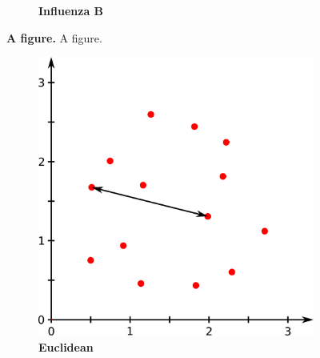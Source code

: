 \begin{figure}
\begin{adjustbox}{minipage=\dimexpr{}\fboxrule,fbox}
\begin{subfigure}[b]{0.475\textwidth}
            \caption[Influenza B]{\textbf{Influenza B}}
            \label{fig:1.0.1b}
        \end{subfigure}
    \end{adjustbox}
    \caption[A figure]{\textbf{A figure.} A figure.}
    \label{fig:1.0.1}
\end{figure}

\begin{figure}
    \begin{adjustbox}{minipage=\dimexpr{}\fboxrule,fbox}
        \begin{subfigure}[b]{0.475\textwidth}
            \includegraphics[width=\textwidth]{Extra_Graphics/Euclidean.pdf}
            \caption[Euclidean]{\textbf{Euclidean}}
            \label{fig:1.0.2a}
        \end{subfigure}
        \hfill
        \begin{subfigure}[b]{0.475\textwidth}

\end{subfigure}
\end{adjustbox}
\end{figure}
